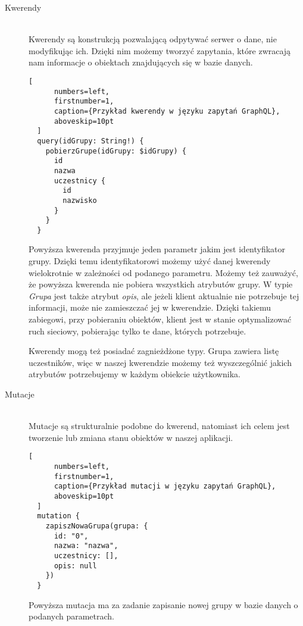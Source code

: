 \begin{description}
  \item[Kwerendy] \hfill \\ Kwerendy są konstrukcją pozwalającą odpytywać serwer o dane, nie modyfikując ich. Dzięki nim możemy tworzyć zapytania, które zwracają nam informacje o obiektach znajdujących się w bazie danych.
  \begin{addmargin}[6mm]{0mm}
  \begin{lstlisting}[
      numbers=left,
      firstnumber=1,
      caption={Przykład kwerendy w języku zapytań GraphQL},
      aboveskip=10pt
  ]
  query(idGrupy: String!) {
    pobierzGrupe(idGrupy: $idGrupy) {
      id
      nazwa
      uczestnicy {
        id
        nazwisko
      }
    }
  }
  \end{lstlisting}
  \end{addmargin}

  Powyższa kwerenda przyjmuje jeden parametr jakim jest identyfikator grupy. Dzięki temu identyfikatorowi możemy użyć danej kwerendy wielokrotnie w zależności od podanego parametru. Możemy też zauważyć, że powyższa kwerenda nie pobiera wszystkich atrybutów grupy. W typie \emph{Grupa} jest także atrybut \emph{opis}, ale jeżeli klient aktualnie nie potrzebuje tej informacji, może nie zamieszczać jej w kwerendzie. Dzięki takiemu zabiegowi, przy pobieraniu obiektów, klient jest w stanie optymalizować ruch sieciowy, pobierając tylko te dane, których potrzebuje. 

  Kwerendy mogą też posiadać zagnieżdżone typy. Grupa zawiera listę uczestników, więc w naszej kwerendzie możemy też wyszczególnić jakich atrybutów potrzebujemy w każdym obiekcie użytkownika.
  \newline
  \item[Mutacje] \hfill \\ Mutacje są strukturalnie podobne do kwerend, natomiast ich celem jest tworzenie lub zmiana stanu obiektów w naszej aplikacji.
  \begin{addmargin}[6mm]{0mm}
  \begin{lstlisting}[
      numbers=left,
      firstnumber=1,
      caption={Przykład mutacji w języku zapytań GraphQL},
      aboveskip=10pt
  ]
  mutation {
    zapiszNowaGrupa(grupa: {
      id: "0",
      nazwa: "nazwa",
      uczestnicy: [],
      opis: null 
    })
  }
  \end{lstlisting}
  \end{addmargin}
  Powyższa mutacja ma za zadanie zapisanie nowej grupy w bazie danych o podanych parametrach.


\end{description}
